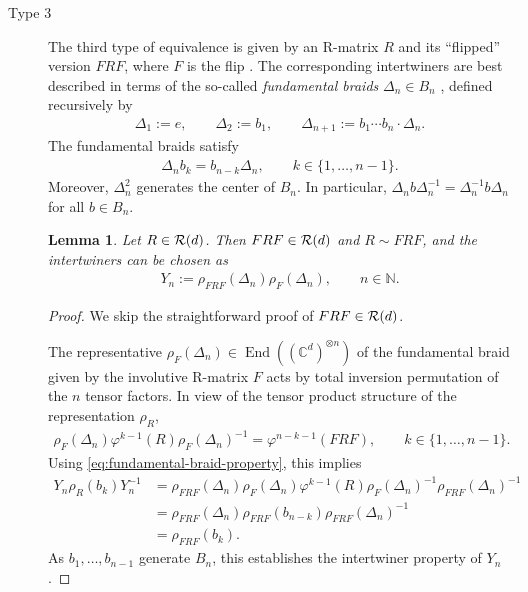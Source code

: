 \documentclass[12pt,a4paper]{amsart}
\numberwithin{equation}{section}
\newtheorem{lemma}[theorem]{Lemma}
\theoremstyle{remark}
\def\End{\operatorname{End}}
\newcommand{\tp}[1]{^{\otimes #1}}    %
\newcommand{\Cl}{\mathbb{C}}
\newcommand{\Nl}{\mathbb{N}}
\begin{document}
\begin{description}
	\item[Type 3] The third type of equivalence is given by an R-matrix $R$ and its ``flipped'' version $FRF$, where $F$ is the flip \cite{LechnerPennigWood:2019}. The corresponding intertwiners are best described in terms of the so-called {\em fundamental braids} $\Delta_n\in B_n$ \cite{Garside:1969}, defined recursively by
	\begin{align}\label{eq:fundamental-braids}
        \Delta_1:=e,\qquad \Delta_2:=b_1,\qquad \Delta_{n+1}:=b_1\cdots b_n\cdot\Delta_n.
	\end{align}
    The fundamental braids satisfy \cite{KasselTuraev:2008}
    \begin{align}\label{eq:fundamental-braid-property}
        \Delta_n b_k = b_{n-k}\Delta_n,\qquad k\in\{1,\ldots,n-1\}.
    \end{align}
    Moreover, $\Delta_n^2$ generates the center of $B_n$. In particular, $\Delta_n b \Delta_n^{-1}=\Delta_n^{-1}b\Delta_n$ for all $b\in B_n$.
	
	\begin{lemma}\label{lemma:intertwinerlemma}
        Let $R\in\mathcal{R}(d)$. Then $FRF\in\mathcal{R}(d)$ and $R\sim FRF$, and the intertwiners can be chosen as 
        \begin{align}\label{eq:R-FRF-intertwiners}
            Y_n 
            :=
            \rho_{FRF}(\Delta_n)\rho_F(\Delta_n)
            ,\qquad n\in\Nl.
        \end{align}
	\end{lemma}
	\begin{proof}
        We skip the straightforward proof of $FRF\in\mathcal{R}(d)$.
        
        The representative $\rho_F(\Delta_n)\in\End((\Cl^d)\tp{n})$ of the  fundamental braid given by the involutive R-matrix $F$ acts by total inversion permutation of the $n$ tensor factors. In view of the tensor product structure of the representation $\rho_R$,
        \begin{align}
            \rho_F(\Delta_n)\varphi^{k-1}(R)\rho_F(\Delta_n)^{-1}
            =
            \varphi^{n-k-1}(FRF),\qquad k\in\{1,\ldots,n-1\}.
        \end{align}
        Using \eqref{eq:fundamental-braid-property}, this implies
        \begin{align*}
            Y_n\rho_R(b_k)Y_n^{-1}
            &=
            \rho_{FRF}(\Delta_n)\rho_F(\Delta_n)
            \varphi^{k-1}(R)
            \rho_F(\Delta_n)^{-1}\rho_{FRF}(\Delta_n)^{-1}
            \\
            &=
            \rho_{FRF}(\Delta_n)\rho_{FRF}(b_{n-k})\rho_{FRF}(\Delta_n)^{-1}
            \\
            &=
            \rho_{FRF}(b_k).
        \end{align*}
        As $b_1,\ldots,b_{n-1}$ generate $B_n$, this establishes the intertwiner property of $Y_n$.
	\end{proof}


\end{description}
\end{document}
